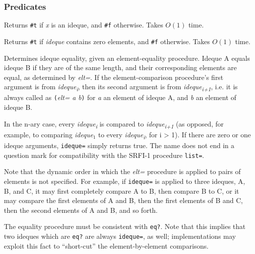 \subsubsection{Predicates}

\begin{entry}{%
  }

  Returns \texttt{\#t} if \emph{x} is an ideque, and \texttt{\#f}
  otherwise. Takes $O(1)$ time.
\end{entry}

\begin{entry}{%
  }

  Returns \texttt{\#t} if \emph{ideque} contains zero elements, and
  \texttt{\#f} otherwise. Takes $O(1)$ time.
\end{entry}


\begin{entry}{%
  }

  Determines ideque equality, given an element-equality
  procedure. Ideque A equals ideque B if they are of the same length,
  and their corresponding elements are equal, as determined by
  \emph{elt=}. If the element-comparison procedure's first argument is
  from \emph{ideque\textsubscript{i}}, then its second argument is
  from \emph{ideque\textsubscript{i+1}}, i.e. it is always called as
  \texttt{(}\emph{elt= a b}\texttt{)} for \emph{a} an element of
  ideque A, and \emph{b} an element of ideque B.

  In the n-ary case, every \emph{ideque\textsubscript{i}} is compared
  to \emph{ideque\textsubscript{i+1}} (as opposed, for example, to
  comparing \emph{ideque$_1$} to every
  \emph{ideque\textsubscript{i}}, for i \textgreater{} 1). If there
  are zero or one ideque arguments, \texttt{ideque=} simply returns
  true. The name does not end in a question mark for compatibility
  with the SRFI-1 procedure \texttt{list=}.

  Note that the dynamic order in which the \emph{elt=} procedure is
  applied to pairs of elements is not specified. For example, if
  \texttt{ideque=} is applied to three ideques, A, B, and C, it may
  first completely compare A to B, then compare B to C, or it may
  compare the first elements of A and B, then the first elements of B
  and C, then the second elements of A and B, and so forth.

  The equality procedure must be consistent with \texttt{eq?}. Note
  that this implies that two ideques which are \texttt{eq?} are always
  \texttt{ideque=}, as well; implementations may exploit this fact to
  ``short-cut'' the element-by-element comparisons.
\end{entry}

